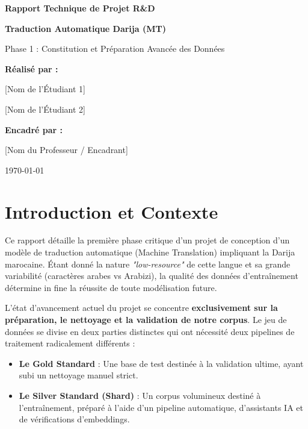 \documentclass[12pt,a4paper]{article}
\begin{document}
\begin{titlepage}
    \centering
    \vspace*{2cm}
    
    {\Huge \bfseries Rapport Technique de Projet R\&D \par}
    \vspace{1cm}
    {\LARGE \bfseries Traduction Automatique Darija (MT) \par}
    \vspace{0.5cm}
    {\large Phase 1 : Constitution et Préparation Avancée des Données \par}
    
    \vspace{2.5cm}
    
    {\Large \bfseries Réalisé par : \par}
    \vspace{0.5cm}
    {\large [Nom de l'Étudiant 1] \par}
    {\large [Nom de l'Étudiant 2] \par}
    
    \vspace{2cm}
    {\Large \bfseries Encadré par : \par}
    \vspace{0.5cm}
    {\large [Nom du Professeur / Encadrant] \par}
    
    \vfill
    {\large \today \par}
\end{titlepage}

\tableofcontents
\newpage

\section{Introduction et Contexte}
Ce rapport détaille la première phase critique d'un projet de conception d'un modèle de traduction automatique (Machine Translation) impliquant la Darija marocaine. Étant donné la nature \textit{"low-resource"} de cette langue et sa grande variabilité (caractères arabes vs Arabizi), la qualité des données d'entraînement détermine in fine la réussite de toute modélisation future. 

L'état d'avancement actuel du projet se concentre \textbf{exclusivement sur la préparation, le nettoyage et la validation de notre corpus}. Le jeu de données se divise en deux parties distinctes qui ont nécessité deux pipelines de traitement radicalement différents :
\begin{itemize}
    \item \textbf{Le Gold Standard} : Une base de test destinée à la validation ultime, ayant subi un nettoyage manuel strict.
    \item \textbf{Le Silver Standard (Shard)} : Un corpus volumineux destiné à l'entraînement, préparé à l'aide d'un pipeline automatique, d'assistants IA et de vérifications d'embeddings.
\end{itemize}
\end{document}
